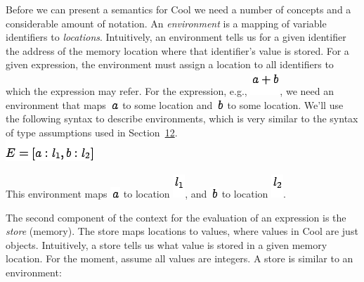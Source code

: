 \documentclass[]{article}
\begin{document}
Before we can present a semantics for Cool we need a number of concepts
and a considerable amount of notation. An \emph{environment} is a
mapping of variable identifiers to \emph{locations}. Intuitively, an
environment tells us for a given identifier the address of the memory
location where that identifier's value is stored. For a given
expression, the environment must assign a location to all identifiers to
which the expression may refer. For the expression, e.g.,
\includegraphics{img115.png}, we need an environment that maps
\includegraphics{img30.png} to some location and
\includegraphics{img116.png} to some location. We'll use the following
syntax to describe environments, which is very similar to the syntax of
type assumptions used in Section~\href{node41.html\#sec-typrules}{12}.
\\

\includegraphics{img117.png}

This environment maps \includegraphics{img30.png} to location
\includegraphics{img118.png}, and \includegraphics{img116.png} to
location \includegraphics{img119.png}.

The second component of the context for the evaluation of an expression
is the \emph{store} (memory). The store maps locations to values, where
values in Cool are just objects. Intuitively, a store tells us what
value is stored in a given memory location. For the moment, assume all
values are integers. A store is similar to an environment: \\
\end{document}
